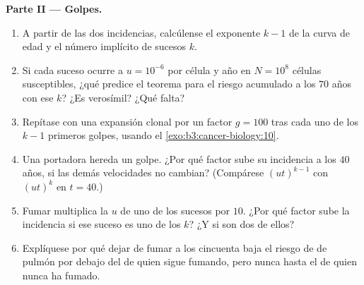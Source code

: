 \begin{problem}
\medskip
\noindent\textbf{Parte II --- Golpes.}
\begin{enumerate}[resume]
  \item A partir de las dos incidencias, calcúlense el exponente $k - 1$
        de la curva de edad y el número implícito de sucesos $k$.
  \item Si cada suceso ocurre a $u = 10^{-6}$ por célula y año en
        $N = 10^{8}$ células susceptibles, ¿qué predice el teorema para
        el riesgo acumulado a los $70$ años con ese $k$? ¿Es verosímil?
        ¿Qué falta?
  \item Repítase con una expansión clonal por un factor $g = 100$ tras
        cada uno de los $k - 1$ primeros golpes, usando el
        \cref{exo:b3:cancer-biology:10}.
  \item Una portadora hereda un golpe. ¿Por qué factor sube su incidencia
        a los $40$ años, si las demás velocidades no cambian? (Compárese
        $(ut)^{k-1}$ con $(ut)^{k}$ en $t = 40$.)
  \item Fumar multiplica la $u$ de uno de los sucesos por $10$. ¿Por qué
        factor sube la incidencia si ese suceso es uno de los $k$? ¿Y si
        son dos de ellos?
  \item Explíquese por qué dejar de fumar a los cincuenta baja el riesgo
        de  de pulmón por debajo del de quien sigue fumando, pero
        nunca hasta el de quien nunca ha fumado.
\end{enumerate}


\end{problem}
